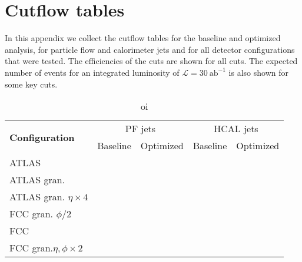 
\chapter{Cutflow tables}
\label{chapter:cutflows}
In this appendix we collect the cutflow tables for the baseline and optimized analysis, for particle flow and calorimeter jets and for all detector configurations that were tested. The efficiencies of the cuts are shown for all cuts. The expected number of events for an integrated luminosity of $\mathcal{L}=30~\text{ab}^{-1}$ is also shown for some key cuts.

\begin{table}[h]
	\caption{oi}
	\label{table:sum_SM}
	\centering
	\begin{tabular}{lcccc}
		\hline
		 \multirow{2}{*}{\textbf{Configuration}} & \multicolumn{2}{c}{PF jets}    & \multicolumn{2}{c}{HCAL jets} \\ \cline{2-5} 
		& Baseline & Optimized & Baseline  & Optimized           \\ \midrule \midrule
		ATLAS&  &                       &           &           \\ 
		\rowcolor{black!7}ATLAS gran.&  &  &           &           \\ 
		ATLAS gran. $\eta\times 4$&  &  &           &           \\ 
		\rowcolor{black!7}FCC gran. $\phi/2$&  &  &           &           \\ 
		FCC&  &  &           &           \\ 
		\rowcolor{black!7}FCC gran.$\eta,\phi \times 2$&  &  &           &           \\ \bottomrule
	\end{tabular}
	
\end{table}


